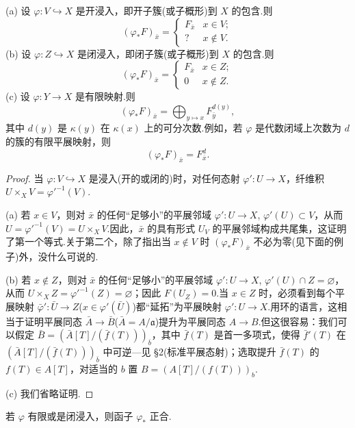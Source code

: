 \begin{proposition}\label{prop:8.3}
(a) 设 $\varphi \colon V \hookrightarrow X$ 是开浸入，即开子簇(或子概形)到 $X$ 的包含.则
\[
(\varphi_{*}F)_{\bar{x}} = \begin{cases}
F_{\bar{x}} & x \in V;\\
? & x \notin V.
\end{cases}
\]
(b) 设 $\varphi \colon Z \hookrightarrow X$ 是闭浸入，即闭子簇(或子概形)到 $X$ 的包含.则
\[
(\varphi_{*}F)_{\bar{x}} = \begin{cases}
F_{\bar{x}} & x \in Z;\\
0 & x \notin Z.
\end{cases}
\]
(c) 设 $\varphi \colon Y \to X$ 是有限映射.则
\[
(\varphi_{*}F)_{\bar{x}} = \bigoplus_{y \mapsto x} F^{d(y)}_{\bar{y}},
\]
其中 $d(y)$ 是 $\kappa(y)$ 在 $\kappa(x)$ 上的可分次数.例如，若 $\varphi$ 是代数闭域上次数为 $d$ 的簇的有限平展映射，则
\[
(\varphi_{*}F)_{\bar{x}} = F^{d}_{\bar{x}}.
\]
\end{proposition}

\begin{proof}
当 $\varphi \colon V \hookrightarrow X$ 是浸入(开的或闭的)时，对任何态射 $\varphi' \colon U \to X$，纤维积 $U \times_{X} V = \varphi'^{-1}(V)$.

(a) 若 $x \in V$，则对 $\bar{x}$ 的任何``足够小''的平展邻域 $\varphi' \colon U \to X$, $\varphi'(U) \subset V$，从而 $U = \varphi'^{-1}(V) = U \times_{X} V$.因此，$\bar{x}$ 的具有形式 $U_V$ 的平展邻域构成共尾集，这证明了第一个等式.关于第二个，除了指出当 $x \notin V$ 时 $(\varphi_{*}F)_{\bar{x}}$ 不必为零(见下面的例子)外，没什么可说的.

(b) 若 $x \notin Z$，则对 $\bar{x}$ 的任何``足够小''的平展邻域 $\varphi' \colon U \to X$, $\varphi'(U) \cap Z = \varnothing$，从而 $U \times_{X} Z = \varphi'^{-1}(Z) = \varnothing$；因此 $F(U_Z) = 0$.当 $x \in Z$ 时，必须看到每个平展映射 $\bar{\varphi}' \colon \bar{U} \to Z$($x \in \varphi'(\bar{U})$)都``延拓''为平展映射 $\varphi' \colon U \to X$.用环的语言，这相当于证明平展同态 $\bar{A} \to \bar{B}$($\bar{A} = A/\mathfrak{a}$)提升为平展同态 $A \to B$.但这很容易：我们可以假定 $\bar{B} = (\bar{A}[T]/(\bar{f}(T)))_{\bar{b}}$，其中 $\bar{f}(T)$ 是首一多项式，使得 $\bar{f}'(T)$ 在 $(\bar{A}[T]/(\bar{f}(T)))_{\bar{b}}$ 中可逆---见 \S 2(标准平展态射)；选取提升 $\bar{f}(T)$ 的 $f(T) \in A[T]$，对适当的 $b$ 置 $B = (A[T]/(f(T)))_b$.

(c) 我们省略证明.
\end{proof}

\begin{corollary}\label{cor:8.4}
若 $\varphi$ 有限或是闭浸入，则函子 $\varphi_{*}$ 正合.
\end{corollary}

